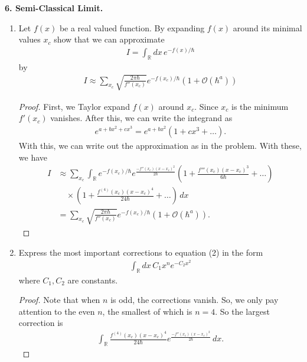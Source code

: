 \documentclass{book}
\theoremstyle{definition}
\newcommand{\R}{\mathbb{R}}
\newcommand{\nn}{\nonumber}
\newcommand{\f}[2]{\frac{#1}{#2}}
\newcommand{\lp}{\left(}
\newcommand{\rp}{\right)}
\begin{document}
\noindent \textbf{6. Semi-Classical Limit.} 

\begin{enumerate}
	\item Let $f(x)$ be a real valued function. By expanding $f(x)$ around its minimal values $x_c$ show that we can approximate
	\begin{align}
	I = \int_\R dx\,e^{-f(x)/\hbar}
	\end{align}
	by
	\begin{align}
	I \approx \sum_{x_c}\sqrt{\f{2\pi \hbar}{f''(x_c)}}e^{-f(x_c)/\hbar}(1+ \mathcal{O}(\hbar^a))
	\end{align}
	\begin{proof}
		First, we Taylor expand $f(x)$ around $x_c$. Since $x_c$ is the minimum $f'(x_c)$ vanishes. After this, we can write the integrand as
		\begin{align}
		e^{a+bx^2+ cx^3} = e^{a+bx^2}\lp 1 + cx^3 + \dots \rp.
		\end{align}		
		With this, we can write out the approximation as in the problem.  With these, we have
		\begin{align}
		I &\approx \sum_{x_c}\int_\R e^{-f(x_c)/\hbar} e^{\f{-f''(x_c)(x-x_c)^2}{2\hbar}}\lp 1+ \f{f'''(x_c)(x-x_c)^3}{6\hbar} + \dots \rp \nn\\
		&\quad \times \lp 1 + \f{f^{(4)} (x_c)(x-x_c)^4}{24\hbar}+\dots \rp \,dx\nn\\
		&= \sum_{x_c}\sqrt{\f{2\pi \hbar}{f''(x_c)}}e^{-f(x_c)/\hbar}\lp 1 +   \mathcal{O}(\hbar^a)\rp.
		\end{align}
		
	\end{proof}


	
	\item Express the most important corrections to equation (2) in the form
	\begin{align}
	\int_\R dx\, C_1x^ne^{-C_2 x^2}
	\end{align}
	where $C_1,C_2$ are constants.
	\begin{proof}
		Note that when $n$ is odd, the corrections vanish. So, we only pay attention to the even $n$, the smallest of which is $n=4$. So the largest correction is 
		\begin{align}
		\int_\R \f{f^{(4)}(x_c)(x-x_c)^4}{24\hbar} e^{\f{-f''(x_c)(x-x_c)^2}{2\hbar}}\,dx.
		\end{align}
	\end{proof}
	

\end{enumerate}
\end{document}
